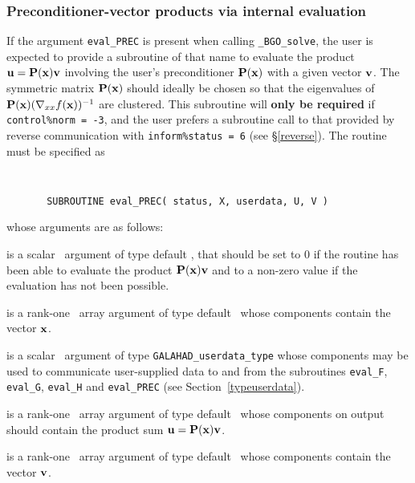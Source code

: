 \documentclass{galahad}
\newcommand{\packagename}{BGO}
\newcommand{\fullpackagename}{\libraryname\_\packagename}
\newcommand{\solver}{{\tt \fullpackagename\_solve}}
\begin{document}

\subsubsection{Preconditioner-vector products via internal evaluation\label{pv}}

If the argument {\tt eval\_PREC} is present when calling \solver, the
user is expected to provide a subroutine of that name to evaluate the
product ${\mathbf{u}} = {\mathbf{P}}({\mathbf{x}}) {\mathbf{v}}$ involving the user's preconditioner
${\mathbf{P}}({\mathbf{x}})$ with a given vector ${\mathbf{v}}$. The symmetric matrix ${\mathbf{P}}({\mathbf{x}})$
should ideally be chosen so that the eigenvalues of
${\mathbf{P}}({\mathbf{x}}) (\nabla_{xx} f({\mathbf{x}}))^{-1}$ are clustered. This subroutine
will {\bf only be required} if {\tt control\%norm = -3}, and the user prefers
a subroutine call to that provided by reverse communication
with {\tt inform\%status = 6} (see \S\ref{reverse}).
The routine must be specified as

\def\baselinestretch{0.8}
{\tt
\begin{verbatim}
       SUBROUTINE eval_PREC( status, X, userdata, U, V )
\end{verbatim} }
\def\baselinestretch{1.0}
\noindent whose arguments are as follows:

\begin{description}
 is a scalar \intentout\ argument of type default \integer,
that should be set to 0 if the routine has been able to evaluate the
product ${\mathbf{P}}({\mathbf{x}}) {\mathbf{v}}$
and to a non-zero value if the evaluation has not been possible.

 is a rank-one \intentin\ array argument of type default \realdp\
whose components contain the vector ${\mathbf{x}}$.

 is a scalar \intentinout\ argument of type
{\tt GALAHAD\_userdata\_type} whose components may be used
to communicate user-supplied data to and from the
subroutines {\tt eval\_F}, {\tt eval\_G},
{\tt eval\_H} and {\tt eval\_PREC}
(see Section~\ref{typeuserdata}).

 is a rank-one \intentout\ array argument of type default \realdp\
whose components on output should contain the product
sum ${\mathbf{u}} = {\mathbf{P}}({\mathbf{x}}) {\mathbf{v}}$.

 is a rank-one \intentin\ array argument of type default \realdp\
whose components contain the vector ${\mathbf{v}}$.

\end{description}
\end{document}
